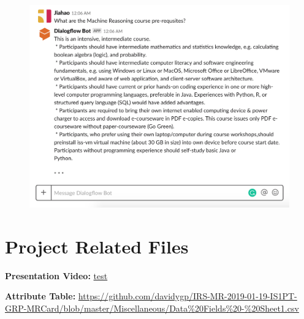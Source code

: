 		\begin{figure}[H]
			\centering
			\includegraphics[width=\linewidth, frame]{img/scenario_2_4.png}
		\end{figure}



\chapter{Project Related Files} %
\label{sub:project_related_files}
	\textbf{Presentation Video:} \url{test}

	\textbf{Attribute Table:} \url{https://github.com/davidygp/IRS-MR-2019-01-19-IS1PT-GRP-MRCard/blob/master/Miscellaneous/Data%20Fields%20-%20Sheet1.csv}



